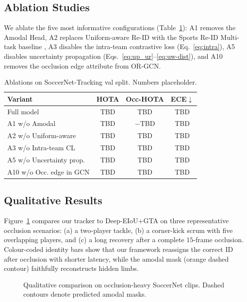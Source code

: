 \documentclass[conference]{IEEEtran}
\begin{document}
\subsection{Ablation Studies}
\label{sec:ablation}

We ablate the five most informative configurations (Table~\ref{tab:ablation}): A1 removes the Amodal Head, A2 replaces Uniform-aware Re-ID with the Sports Re-ID Multi-task baseline \cite{multitaskreid}, A3 disables the intra-team contrastive loss (Eq.~\ref{eq:intra}), A5 disables uncertainty propagation (Eqs.~\ref{eq:up_ur}--\ref{eq:uw-dist}), and A10 removes the occlusion edge attribute from OR-GCN.

\begin{table}[t]
\centering
\caption{Ablations on SoccerNet-Tracking val split. Numbers placeholder.}
\label{tab:ablation}
\small
\begin{tabular}{lccc}
\toprule
Variant & HOTA & Occ-HOTA & ECE$\downarrow$ \\
\midrule
Full model                  & TBD & TBD & TBD \\
A1 w/o Amodal               & TBD & $-$TBD & TBD \\
A2 w/o Uniform-aware        & TBD & TBD & TBD \\
A3 w/o Intra-team CL        & TBD & TBD & TBD \\
A5 w/o Uncertainty prop.    & TBD & TBD & TBD \\
A10 w/o Occ. edge in GCN    & TBD & TBD & TBD \\
\bottomrule
\end{tabular}
\end{table}

\subsection{Qualitative Results}
\label{sec:qual}

Figure~\ref{fig:qual} compares our tracker to Deep-EIoU+GTA on three representative occlusion scenarios: (a) a two-player tackle, (b) a corner-kick scrum with five overlapping players, and (c) a long recovery after a complete $15$-frame occlusion. Colour-coded identity bars show that our framework reassigns the correct ID after occlusion with shorter latency, while the amodal mask (orange dashed contour) faithfully reconstructs hidden limbs.

\begin{figure}[t]
  \centering
  \caption{Qualitative comparison on occlusion-heavy SoccerNet clips. Dashed contours denote predicted amodal masks.}
  \label{fig:qual}
\end{figure}
\end{document}
